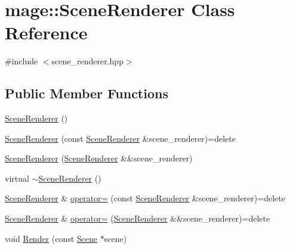 \hypertarget{classmage_1_1_scene_renderer}{}\section{mage\+:\+:Scene\+Renderer Class Reference}
\label{classmage_1_1_scene_renderer}


{\ttfamily \#include $<$scene\+\_\+renderer.\+hpp$>$}

\subsection*{Public Member Functions}
\begin{DoxyCompactItemize}
\item 
\hyperlink{classmage_1_1_scene_renderer_a5d91f3c9b4e6e7c16d77a6791fadbd64}{Scene\+Renderer} ()
\item 
\hyperlink{classmage_1_1_scene_renderer_a9ea97945a7675ef805f00fb437a3d1aa}{Scene\+Renderer} (const \hyperlink{classmage_1_1_scene_renderer}{Scene\+Renderer} \&scene\+\_\+renderer)=delete
\item 
\hyperlink{classmage_1_1_scene_renderer_ab9846f0a77e2bc5e9eeb00aed67424eb}{Scene\+Renderer} (\hyperlink{classmage_1_1_scene_renderer}{Scene\+Renderer} \&\&scene\+\_\+renderer)
\item 
virtual \hyperlink{classmage_1_1_scene_renderer_a546f45fc7542fa1677d3e9c2014f108e}{$\sim$\+Scene\+Renderer} ()
\item 
\hyperlink{classmage_1_1_scene_renderer}{Scene\+Renderer} \& \hyperlink{classmage_1_1_scene_renderer_a5b63908f5bdfe6128b43847db01db983}{operator=} (const \hyperlink{classmage_1_1_scene_renderer}{Scene\+Renderer} \&scene\+\_\+renderer)=delete
\item 
\hyperlink{classmage_1_1_scene_renderer}{Scene\+Renderer} \& \hyperlink{classmage_1_1_scene_renderer_af64b01e57b0367a285f48e1f34f291e3}{operator=} (\hyperlink{classmage_1_1_scene_renderer}{Scene\+Renderer} \&\&scene\+\_\+renderer)=delete
\item 
void \hyperlink{classmage_1_1_scene_renderer_aa7825b36b1c9e0d22cbd49a9df5e73e4}{Render} (const \hyperlink{classmage_1_1_scene}{Scene} $\ast$scene)
\end{DoxyCompactItemize}
